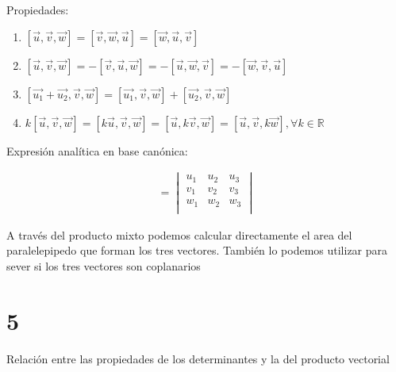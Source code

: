 \documentclass[
	12pt, %
	spanish, %
]{fphw}
\newcommand{\vu}{\vec{u}}
\newcommand{\vv}{\vec{v}}
\newcommand{\vw}{\vec{w}}
\begin{document}
Propiedades:

\begin{enumerate}
	\item $[\vu,\vv,\vw] = [\vv,\vw,\vu] = [\vw,\vu,\vv]$
	\item $[\vu,\vv,\vw] = - [\vv,\vu,\vw] = - [\vu,\vw,\vv] = - [\vw,\vv,\vu]$
	\item $[\vec{u_1} + \vec{u_2}, \vv,\vw] = [\vec{u_1},\vv,\vw] + [\vec{u_2},\vv,\vw]$
	\item $k[\vu,\vv,\vw] = [k\vu,\vv,\vw] = [\vu,k\vv,\vw] = [\vu,\vv,k\vw], \forall k \in \mathbb{R}$
\end{enumerate}

Expresión analítica en base canónica:

\begin{gather*}
	[\vu,\vv,\vw] = 
	\begin{vmatrix}
		u_1 & u_2 & u_3\\
		v_1 & v_2 & v_3\\
		w_1 & w_2 & w_3 \\
	\end{vmatrix}
\end{gather*}

A través del producto mixto podemos calcular directamente el area del paralelepipedo que forman los tres vectores. También lo podemos utilizar para sever si los tres vectores son coplanarios

\section*{5}

\begin{problem}
	Relación entre las propiedades de los determinantes y la del producto vectorial
\end{problem}
\end{document}
